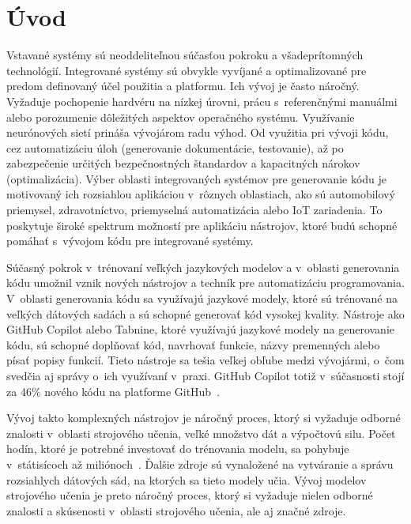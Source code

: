 
%

\chapter{Úvod}

Vstavané systémy sú neoddeliteľnou súčasťou pokroku a všadeprítomných technológií. Integrované systémy sú obvykle vyvíjané a optimalizované pre predom definovaný účel použitia a platformu. Ich vývoj je často náročný. Vyžaduje pochopenie hardvéru na nízkej úrovni, prácu s~referenčnými manuálmi alebo porozumenie dôležitých aspektov operačného systému. Využívanie neurónových sietí prináša vývojárom radu výhod. Od využitia pri vývoji kódu, cez automatizáciu úloh (generovanie dokumentácie, testovanie), až po zabezpečenie určitých bezpečnostných štandardov a kapacitných nárokov (optimalizácia). Výber oblasti integrovaných systémov pre generovanie kódu je motivovaný ich rozsiahlou aplikáciou v~rôznych oblastiach, ako sú automobilový priemysel, zdravotníctvo, priemyselná automatizácia alebo IoT zariadenia. To poskytuje široké spektrum možností pre aplikáciu nástrojov, ktoré budú schopné pomáhať s~vývojom kódu pre integrované systémy.

Súčasný pokrok v~trénovaní veľkých jazykových modelov a v~oblasti generovania kódu umožnil vznik nových nástrojov a techník pre automatizáciu programovania. V~oblasti generovania kódu sa využívajú jazykové modely, ktoré sú trénované na veľkých dátových sadách a sú schopné generovať kód vysokej kvality. Nástroje ako GitHub Copilot alebo Tabnine, ktoré využívajú jazykové modely na generovanie kódu, sú schopné doplňovať kód, navrhovať funkcie, názvy premenných alebo písať popisy funkcií. Tieto nástroje sa tešia veľkej obľube medzi vývojármi, o~čom svedčia aj správy o~ich využívaní v~praxi. GitHub Copilot totiž v~súčasnosti stojí za 46\% nového kódu na platforme GitHub~\cite{githubcopilot}.

Vývoj takto komplexných nástrojov je náročný proces, ktorý si vyžaduje odborné znalosti v~oblasti strojového učenia, veľké množstvo dát a výpočtovú silu. Počet hodín, ktoré je potrebné investovať do trénovania modelu, sa pohybuje v~státisícoch až miliónoch~\cite{li2023starcoder,workshop2023bloom}. Ďalšie zdroje sú vynaložené na vytváranie a správu rozsiahlych dátových sád, na ktorých sa tieto modely učia. Vývoj modelov strojového učenia je preto náročný proces, ktorý si vyžaduje nielen odborné znalosti a skúsenosti v~oblasti strojového učenia, ale aj značné zdroje.

